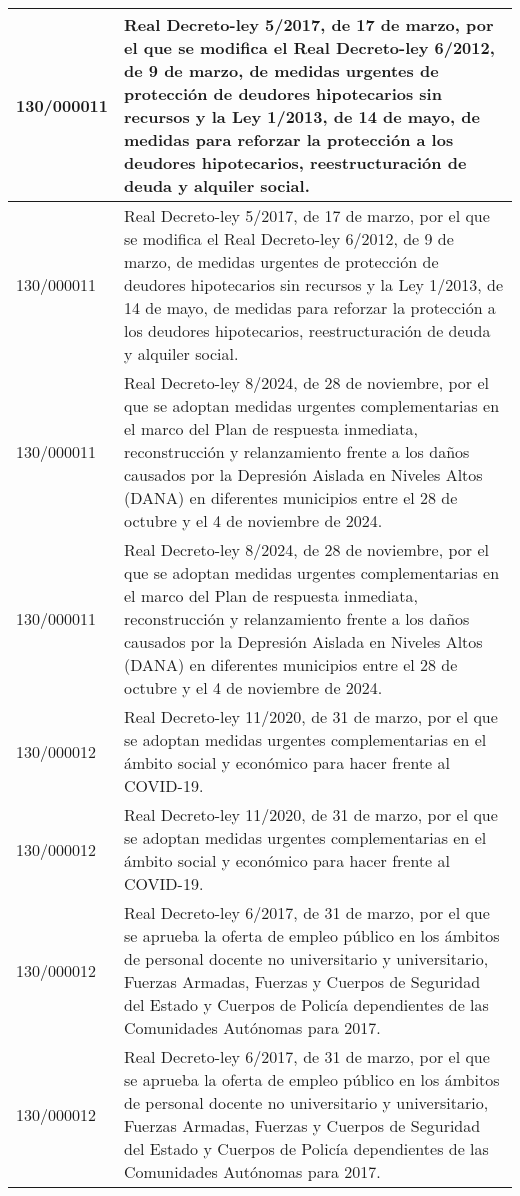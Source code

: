 {\begin{table}[H]
\begin{center}
\begin{tabularx}{\linewidth}{| l | X |}
\hline
130/000011 & Real Decreto-ley 5/2017, de 17 de marzo, por el que se modifica el Real Decreto-ley 6/2012, de 9 de marzo, de medidas urgentes de protección de deudores hipotecarios sin recursos y la Ley 1/2013, de 14 de mayo, de medidas para reforzar la protección a los deudores hipotecarios, reestructuración de deuda y alquiler social. \\
\hline
130/000011 & Real Decreto-ley 5/2017, de 17 de marzo, por el que se modifica el Real Decreto-ley 6/2012, de 9 de marzo, de medidas urgentes de protección de deudores hipotecarios sin recursos y la Ley 1/2013, de 14 de mayo, de medidas para reforzar la protección a los deudores hipotecarios, reestructuración de deuda y alquiler social. \\
\hline
130/000011 & Real Decreto-ley 8/2024, de 28 de noviembre, por el que se adoptan medidas urgentes complementarias en el marco del Plan de respuesta inmediata, reconstrucción y relanzamiento frente a los daños causados por la Depresión Aislada en Niveles Altos (DANA) en diferentes municipios entre el 28 de octubre y el 4 de noviembre de 2024. \\
\hline
130/000011 & Real Decreto-ley 8/2024, de 28 de noviembre, por el que se adoptan medidas urgentes complementarias en el marco del Plan de respuesta inmediata, reconstrucción y relanzamiento frente a los daños causados por la Depresión Aislada en Niveles Altos (DANA) en diferentes municipios entre el 28 de octubre y el 4 de noviembre de 2024. \\
\hline
130/000012 & Real Decreto-ley 11/2020, de 31 de marzo, por el que se adoptan medidas urgentes complementarias en el ámbito social y económico para hacer frente al COVID-19. \\
\hline
130/000012 & Real Decreto-ley 11/2020, de 31 de marzo, por el que se adoptan medidas urgentes complementarias en el ámbito social y económico para hacer frente al COVID-19. \\
\hline
130/000012 & Real Decreto-ley 6/2017, de 31 de marzo, por el que se aprueba la oferta de empleo público en los ámbitos de personal docente no universitario y universitario, Fuerzas Armadas, Fuerzas y Cuerpos de Seguridad del Estado y Cuerpos de Policía dependientes de las Comunidades Autónomas para 2017. \\
\hline
130/000012 & Real Decreto-ley 6/2017, de 31 de marzo, por el que se aprueba la oferta de empleo público en los ámbitos de personal docente no universitario y universitario, Fuerzas Armadas, Fuerzas y Cuerpos de Seguridad del Estado y Cuerpos de Policía dependientes de las Comunidades Autónomas para 2017. \\

\end{tabularx}
\end{center}
\end{table}}
